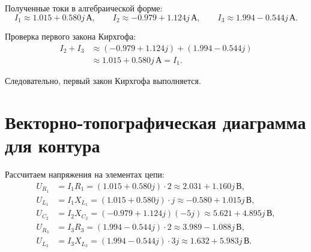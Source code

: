\documentclass[12pt,a4paper]{article}
\newcommand{\Volt}{\,\text{В}}
\newcommand{\Amp}{\,\text{А}}
\begin{document}
Полученные токи в алгебраической форме:
\[
I_1 \approx 1.015 + 0.580j\Amp, \qquad
I_2 \approx -0.979 + 1.124j\Amp, \qquad
I_3 \approx 1.994 - 0.544j\Amp.
\]

\begin{center}
\end{center}

Проверка первого закона Кирхгофа:
\begin{equation*}
\begin{aligned}
I_2 + I_3 &\approx (-0.979 + 1.124j) + (1.994 - 0.544j) \\
&\approx 1.015 + 0.580j\Amp = I_1.
\end{aligned}
\end{equation*}

Следовательно, первый закон Кирхгофа выполняется.

\section{Векторно-топографическая диаграмма для контура}

Рассчитаем напряжения на элементах цепи:
\begin{equation*}
\begin{aligned}
U_{R_1} &= I_1 R_1 = (1.015 + 0.580j)\cdot 2 \approx 2.031 + 1.160j\Volt,\\
U_{L_1} &= I_1 X_{L_1} = (1.015 + 0.580j)\cdot j \approx -0.580 + 1.015j\Volt,\\
U_{C_2} &= I_2 X_{C_2} = (-0.979 + 1.124j)(-5j) \approx 5.621 + 4.895j\Volt,\\
U_{R_3} &= I_3 R_3 = (1.994 - 0.544j)\cdot 2 \approx 3.989 - 1.088j\Volt,\\
U_{L_3} &= I_3 X_{L_3} = (1.994 - 0.544j)\cdot 3j \approx 1.632 + 5.983j\Volt.
\end{aligned}
\end{equation*}
\end{document}
